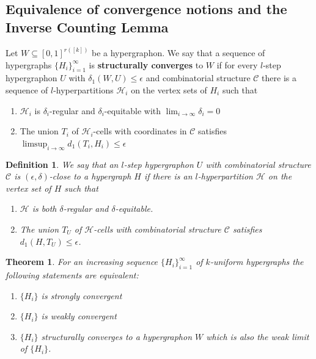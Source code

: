 \documentclass [11pt] {article}
\newtheorem{theorem}{Theorem}
\newtheorem{definition}{Definition}[section]
\def\to{\rightarrow}
\begin{document}
\subsection{Equivalence of convergence notions and the Inverse Counting Lemma}

Let $W\subseteq [0,1]^{r([k])}$ be a hypergraphon. 
We say that a sequence of hypergraphs $\{H_i\}_{i=1}^{\infty}$ is {\bf
  structurally converges} to $W$ if for every $l$-step hypergraphon $U$ with 
$\delta_1(W,U)\leq\epsilon$ and combinatorial structure $\mathcal{C}$ 
there is a sequence of $l$-hyperpartitions $\mathcal{H}_i$ on the vertex 
sets of $H_i$ such that
\begin{enumerate}
\item $\mathcal{H}_i$ is $\delta_i$-regular and $\delta_i$-equitable with 
$\lim_{i\to\infty}\delta_i=0$
\item The union $T_i$ of $\mathcal{H}_i$-cells with coordinates 
in $\mathcal{C}$ satisfies $\limsup_{i\to\infty} d_1(T_i,H_i)\leq\epsilon$
\end{enumerate}


\begin{definition} We say that an $l$-step hypergraphon $U$ 
with combinatorial structure $\mathcal{C}$ is $(\epsilon,\delta)$-close 
to a hypergraph $H$ if there is an $l$-hyperpartition 
$\mathcal{H}$ on the vertex set of $H$ such that
\begin{enumerate}
\item $\mathcal{H}$ is both $\delta$-regular and $\delta$-equitable.
\item The union $T_U$ of $\mathcal{H}$-cells with combinatorial
 structure $\mathcal{C}$ satisfies $d_1(H,T_U)\leq \epsilon$.
\end{enumerate}
\end{definition}

\begin{theorem}\label{three} For an increasing sequence $\{H_i\}_{i=1}^\infty$ of 
$k$-uniform hypergraphs the following statements are equivalent:
\begin{enumerate}
\item $\{H_i\}$ is strongly convergent
\item $\{H_i\}$ is weakly convergent
\item $\{H_i\}$ structurally converges to a hypergraphon $W$ 
which is also the weak limit of $\{H_i\}$.
\end{enumerate}
\end{theorem}
\end{document}
